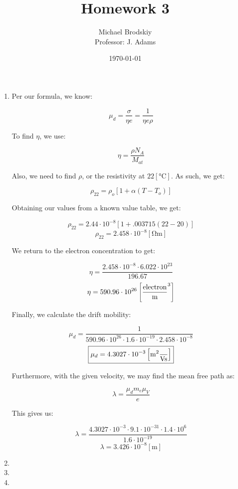 


\title{Homework 3}
\date{\today}
\author{Michael Brodskiy\\ \small Professor: J. Adams}



\maketitle

\begin{enumerate}

  \item Per our formula, we know:

    $$\mu_d=\frac{\sigma}{\eta e}=\frac{1}{\eta e\rho}$$

    To find $\eta$, we use:

    $$\eta=\frac{\rho N_A}{M_{at}}$$

    Also, we need to find $\rho$, or the resistivity at $22\left[ \si{\celsius} \right]$. As such, we get:

    $$\rho_{22}=\rho_o[1+\alpha(T-T_o)]$$

    Obtaining our values from a known value table, we get:

    $$\rho_{22}=2.44\cdot10^{-8}[1+.003715(22-20)]$$
    $$\rho_{22}=2.458\cdot10^{-8}\left[ \si{\ohm\meter} \right]$$

    We return to the electron concentration to get:

    $$\eta=\frac{2.458\cdot10^{-8}\cdot 6.022\cdot10^{23}}{196.67}$$
    $$\eta=590.96\cdot10^{26}\left[ \si{electron\over\meter\cubed} \right]$$

    Finally, we calculate the drift mobility:

    $$\mu_d=\frac{1}{590.96\cdot10^{26}\cdot1.6\cdot10^{-19}\cdot 2.458\cdot10^{-8}}$$
    $$\boxed{\mu_d=4.3027\cdot10^{-3}\left[ \si{\meter\squared\over\volt\second} \right]}$$

    Furthermore, with the given velocity, we may find the mean free path as:

    $$\lambda=\frac{\mu_d m_e\mu_V}{e}$$

    This gives us:

    $$\lambda=\frac{4.3027\cdot10^{-3}\cdot9.1\cdot10^{-31}\cdot1.4\cdot10^{6}}{1.6\cdot10^{-19}}$$
    $$\boxed{\lambda=3.426\cdot10^{-8}[\si{\meter}]}$$

  \item

  \item

  \item

\end{enumerate}



